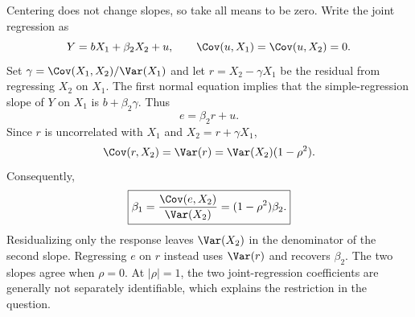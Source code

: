 Centering does not change slopes, so take all means to be zero. Write the joint regression as
\[
 Y=bX_1+\beta_2X_2+u,
 \qquad \Cov(u,X_1)=\Cov(u,X_2)=0.
\]
Set $\gamma=\Cov(X_1,X_2)/\Var(X_1)$ and let $r=X_2-\gamma X_1$ be the residual from regressing $X_2$ on $X_1$. The first normal equation implies that the simple-regression slope of $Y$ on $X_1$ is $b+\beta_2\gamma$. Thus
\[
 e=\beta_2r+u.
\]
Since $r$ is uncorrelated with $X_1$ and $X_2=r+\gamma X_1$,
\[
 \Cov(r,X_2)=\Var(r)
 =\Var(X_2)(1-\rho^2).
\]
Consequently,
\[
 \boxed{\beta_1
 =\frac{\Cov(e,X_2)}{\Var(X_2)}
 =(1-\rho^2)\beta_2.}
\]
Residualizing only the response leaves $\Var(X_2)$ in the denominator of the second slope. Regressing $e$ on $r$ instead uses $\Var(r)$ and recovers $\beta_2$. The two slopes agree when $\rho=0$. At $|\rho|=1$, the two joint-regression coefficients are generally not separately identifiable, which explains the restriction in the question.

